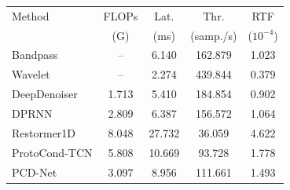 \begin{tabular}{lcccc}
\toprule
Method & FLOPs & Lat. & Thr. & RTF \\
       & (G) & (ms) & (samp./s) & ($10^{-4}$) \\
\midrule
Bandpass & -- & 6.140 & 162.879 & 1.023 \\
Wavelet & -- & 2.274 & 439.844 & 0.379 \\
DeepDenoiser & 1.713 & 5.410 & 184.854 & 0.902 \\
DPRNN & 2.809 & 6.387 & 156.572 & 1.064 \\
Restormer1D & 8.048 & 27.732 & 36.059 & 4.622 \\
ProtoCond-TCN & 5.808 & 10.669 & 93.728 & 1.778 \\
PCD-Net & 3.097 & 8.956 & 111.661 & 1.493 \\
\bottomrule
\end{tabular}
